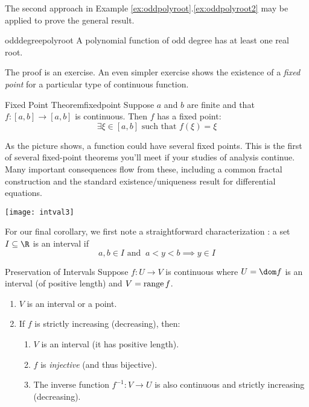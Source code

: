 The second approach in Example \ref*{ex:oddpolyroot}.\ref{ex:oddpolyroot2} may be applied to prove the general result.

\begin{cor}{}{odddegreepolyroot}
	A polynomial function of odd degree has at least one real root.
\end{cor}


The proof is an exercise. An even simpler exercise shows the existence of a \emph{fixed point} for a particular type of continuous function. 


\begin{cor}{Fixed Point Theorem}{fixedpoint}
	Suppose $a$ and $b$ are finite and that $f:[a,b]\to [a,b]$ is continuous. Then $f$ has a fixed point:
	\[\exists\xi\in[a,b]\text{ such that }f(\xi)=\xi\]
\end{cor}

\begin{minipage}[t]{0.7\linewidth}\vspace{0pt}
	As the picture shows, a function could have several fixed points.\smallbreak
	This is the first of several fixed-point theorems you'll meet if your studies of analysis continue. Many important consequences flow from these, including a common fractal construction and the standard existence/uniqueness result for differential equations. 
\end{minipage}
\hfill
\begin{minipage}[t]{0.29\linewidth}\vspace{0pt}
	\flushright\texttt{[image: intval3]}
\end{minipage}


\goodbreak

For our final corollary, we first note a straightforward characterization%
: a set $I\subseteq\R$ is an interval if
\[a,b\in I \text{ and }\ a<y<b\implies y\in I\tag{$\ast$}\]

\begin{cor}{Preservation of Intervals}{}
	Suppose $f:U\to V$ is continuous where $U=\dom f$ is an interval (of positive length) and $V=\operatorname{range} f$.\vspace{-1pt}
	\begin{enumerate}\itemsep0pt
	  \item $V$ is an interval or a point.
	  \item If $f$ is strictly increasing (decreasing), then:\vspace{-3pt}
		\begin{enumerate}
		  \item $V$ is an interval (it has positive length).
		  \item $f$ is \emph{injective} (and thus bijective).
		  \item The inverse function $f^{-1}:V\to U$ is also continuous and strictly increasing (decreasing).
		\end{enumerate}
	\end{enumerate}
\end{cor}

